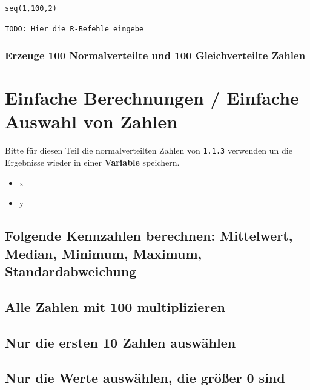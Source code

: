 \documentclass{article}
\begin{document}
 \begin{lstlisting}
seq(1,100,2)
 \end{lstlisting}
 
 \begin{verbatim}
TODO: Hier die R-Befehle eingebe
 \end{verbatim}
 
 \subsubsection{Erzeuge 100 Normalverteilte und 100 Gleichverteilte Zahlen}
 





\section{Einfache Berechnungen / Einfache Auswahl von Zahlen}

Bitte für diesen Teil die normalverteilten Zahlen von \texttt{1.1.3} verwenden un die Ergebnisse wieder in einer \textbf{Variable} speichern.

\begin{itemize}
	\item x
	\item y
\end{itemize}

\subsection{Folgende Kennzahlen berechnen: Mittelwert, Median, Minimum, Maximum, Standardabweichung}

\subsection{Alle Zahlen mit 100 multiplizieren}

\subsection{Nur die ersten 10 Zahlen auswählen}

\subsection{Nur die Werte auswählen, die größer 0 sind}

\end{document}
